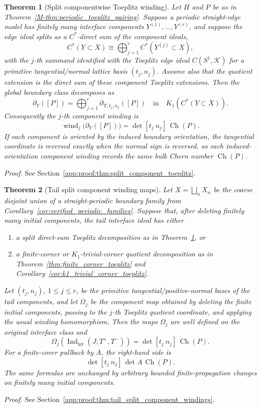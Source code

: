 \documentclass[11pt]{article}
\numberwithin{equation}{section}
\newtheorem{theorem}{Theorem}[section]
\theoremstyle{definition}
\theoremstyle{remark}
\newcommand{\proofref}[1]{%
  \par\noindent\emph{Proof.} See Section~\ref{#1}.\par\medskip
}
\newcommand{\proofappendixref}[1]{\proofref{#1}}
\newcommand{\Indint}{\operatorname{Ind}_{\mathrm{int}}}
\newcommand{\Ch}{\operatorname{Ch}}
\begin{document}
\begin{theorem}[Split componentwise Toeplitz winding]\label{thm:split_component_toeplitz}
Let \(H\) and \(P\) be as in Theorem~\ref{M-thm:periodic_toeplitz_pairing}. Suppose a periodic
straight-edge model has finitely many interface components \(Y^{(1)},\ldots,Y^{(r)}\), and suppose
the edge ideal splits as a \(C^*\)-direct sum of the component ideals,
\[
C^*(Y\subset X)
\cong
\bigoplus_{j=1}^r C^*(Y^{(j)}\subset X),
\]
with the \(j\)-th summand identified with the Toeplitz edge ideal
\(C(S^1,\mathcal K)\) for a primitive tangential/normal lattice basis \((t_j,n_j)\). Assume also
that the quotient extension is the direct sum of these component Toeplitz extensions. Then the
global boundary class decomposes as
\[
\partial_Y([P])
=
\bigoplus_{j=1}^r \partial_{\mathrm T,t_j,n_j}([P])
\quad\text{in}\quad
K_1(C^*(Y\subset X)).
\]
Consequently the \(j\)-th component winding is
\[
\operatorname{wind}_j\bigl(\partial_Y([P])\bigr)
=
\det[t_j\ n_j]\,\Ch(P).
\]
If each component is oriented by the induced boundary orientation, the tangential coordinate is
reversed exactly when the normal sign is reversed, so each induced-orientation component winding
records the same bulk Chern number \(\Ch(P)\).
\end{theorem}
\proofappendixref{app:proof:thm:split_component_toeplitz}





\begin{theorem}[Tail split component winding maps]\label{thm:tail_split_component_windings}
Let \(X=\bigsqcup_n X_n\) be the coarse disjoint union of a straight-periodic boundary family from
Corollary~\ref{cor:verified_periodic_families}. Suppose that, after deleting finitely many initial
components, the tail interface ideal has either
\begin{enumerate}[label=(\roman*),leftmargin=2em]
\item a split direct-sum Toeplitz decomposition as in
  Theorem~\ref{thm:split_component_toeplitz}, or
\item a finite-corner or \(K_1\)-trivial-corner quotient decomposition as in
  Theorem~\ref{thm:finite_corner_toeplitz} and
  Corollary~\ref{cor:k1_trivial_corner_toeplitz}.
\end{enumerate}
Let \((t_j,n_j)\), \(1\le j\le r\), be the primitive tangential/positive-normal bases of the tail
components, and let \(\Omega_j\) be the component map obtained by deleting the finite initial
components, passing to the \(j\)-th Toeplitz quotient coordinate, and applying the usual winding
homomorphism. Then the maps \(\Omega_j\) are well defined on the original interface class and
\[
\Omega_j\!\left(\Indint(J;T^+,T^-)\right)
=
\det[t_j\ n_j]\,\Ch(P).
\]
For a finite-cover pullback by \(A\), the right-hand side is
\[
\det[t_j\ n_j]\,\det A\,\Ch(P).
\]
The same formulas are unchanged by arbitrary bounded finite-propagation changes on finitely many
initial components.
\end{theorem}
\proofappendixref{app:proof:thm:tail_split_component_windings}
\end{document}
